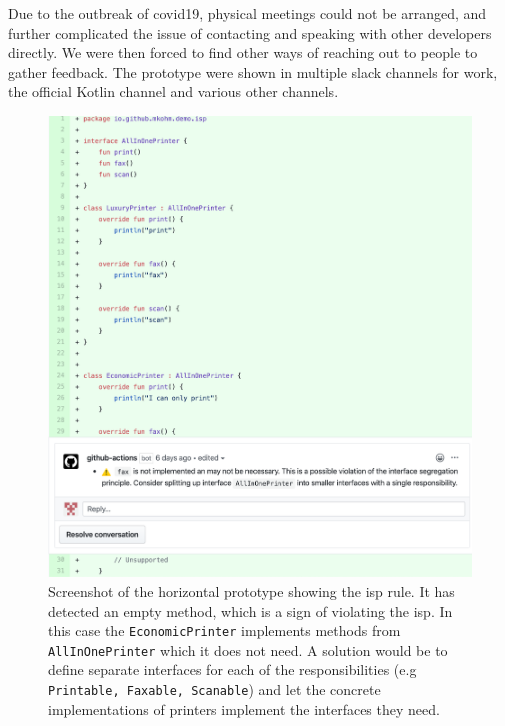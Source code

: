 \documentclass[pdftex,10pt,b5paper,twoside]{report}
\begin{document}
Due to the outbreak of \gls{covid19}, physical meetings could not be arranged, and further complicated the issue of contacting and speaking with other developers directly. We were then forced to find other ways of reaching out to people to gather feedback. The prototype were shown in multiple slack channels for work, the official Kotlin channel and various other channels.

\clearpage
\begin{figure}[h!]
    \centering
    \includegraphics[width=\textwidth]{images/final_isp.png}
    \caption{Screenshot of the horizontal prototype showing the \gls{isp} rule. It has detected an empty method, which is a sign of violating the \gls{isp}. In this case the \texttt{EconomicPrinter} implements methods from \texttt{AllInOnePrinter} which it does not need. A solution would be to define separate interfaces for each of the responsibilities (e.g \texttt{Printable, Faxable, Scanable}) and let the concrete implementations of printers implement the interfaces they need.}
    \label{fig:horizontal-prototype}
\end{figure}
\end{document}

